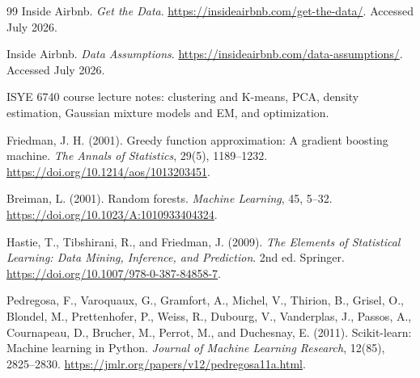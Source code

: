 \documentclass[11pt]{article}
\begin{document}
\begin{thebibliography}{99}
Inside Airbnb. \textit{Get the Data}. \url{https://insideairbnb.com/get-the-data/}. Accessed July 2026.

Inside Airbnb. \textit{Data Assumptions}. \url{https://insideairbnb.com/data-assumptions/}. Accessed July 2026.

ISYE 6740 course lecture notes: clustering and K-means, PCA, density estimation, Gaussian mixture models and EM, and optimization.

Friedman, J. H. (2001). Greedy function approximation: A gradient boosting machine. \textit{The Annals of Statistics}, 29(5), 1189--1232. \url{https://doi.org/10.1214/aos/1013203451}.

Breiman, L. (2001). Random forests. \textit{Machine Learning}, 45, 5--32. \url{https://doi.org/10.1023/A:1010933404324}.

Hastie, T., Tibshirani, R., and Friedman, J. (2009). \textit{The Elements of Statistical Learning: Data Mining, Inference, and Prediction}. 2nd ed. Springer. \url{https://doi.org/10.1007/978-0-387-84858-7}.

Pedregosa, F., Varoquaux, G., Gramfort, A., Michel, V., Thirion, B., Grisel, O., Blondel, M., Prettenhofer, P., Weiss, R., Dubourg, V., Vanderplas, J., Passos, A., Cournapeau, D., Brucher, M., Perrot, M., and Duchesnay, E. (2011). Scikit-learn: Machine learning in Python. \textit{Journal of Machine Learning Research}, 12(85), 2825--2830. \url{https://jmlr.org/papers/v12/pedregosa11a.html}.
\end{thebibliography}
\end{document}
